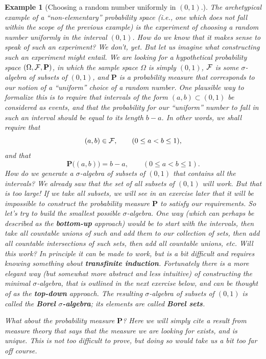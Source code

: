 \documentclass[12pt]{article}
\newcommand{\prob}{\mathbf{P}}
\theoremstyle{example}
\newtheorem{example}[thm]{Example}
\begin{document}
\begin{example}[Choosing a random number uniformly in $(0,1)$.] The archetypical example of a ``non-elementary'' probability space (i.e., one which does not fall within the scope of the previous example) is the experiment of choosing a random number uniformly in the interval $(0,1)$. How do we know that it makes sense to speak of such an experiment? We don't, \emph{yet}. But let us imagine what constructing such an experiment might entail. We are looking for a hypothetical probability space $(\Omega, {\cal F}, \prob)$, in which the sample space $\Omega$ is simply $(0,1)$, ${\cal F}$ is some $\sigma$-algebra of subsets of $(0,1)$, and $\prob$ is a probability measure that corresponds to our notion of a ``uniform'' choice of a random number. One plausible way to formalize this is to require that intervals of the form $(a,b) \subset (0,1)$ be considered as events, and that the probability for our ``uniform'' number to fall in such an interval should be equal to its length $b-a$. In other words, we shall require that
$$ (a,b) \in {\cal F}, \qquad (0\le a<b\le 1),$$
and that
\begin{equation} \label{eq:lebesgue}
\prob\big((a,b)\big) = b-a, \qquad (0\le a<b\le 1).
\end{equation}
How do we generate a $\sigma$-algebra of subsets of $(0,1)$ that contains all the intervals? We already saw that the set of \emph{all} subsets of $(0,1)$ will work. But that is too large! If we take all subsets, we will see in an exercise later that it will be impossible to construct the probability measure $\prob$ to satisfy our requirements. So let's try to build the \emph{smallest possible} $\sigma$-algebra. One way (which can perhaps be described as the \textbf{bottom-up} approach) would be to start with the intervals, then take all countable unions of such and add them to our collection of sets, then add all countable intersections of such sets, then add all countable unions, etc. Will this work? In principle it can be made to work, but is a bit difficult and requires knowing something about \textbf{transfinite induction}. Fortunately there is a more elegant way (but somewhat more abstract and less intuitive) of constructing the minimal $\sigma$-algebra, that is outlined in the next exercise below, and can be thought of as the \textbf{top-down} approach. The resulting $\sigma$-algebra of subsets of $(0,1)$ is called the \textbf{Borel $\sigma$-algebra}; its elements are called \textbf{Borel sets}.

What about the probability measure $\prob$? Here we will simply cite a result from measure theory that says that the measure we are looking for exists, and is unique. This is not too difficult to prove, but doing so would take us a bit too far off course.


\end{example}
\end{document}

